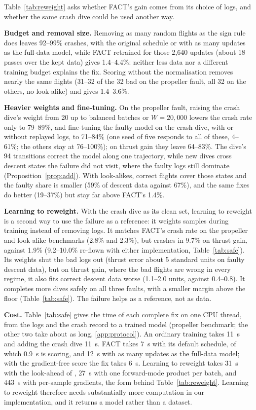 \documentclass[preprint,12pt]{elsarticle}
\newcommand{\method}{FACT}
\begin{document}
Table~\ref{tab:reweight} asks whether \method{}'s gain comes from its choice of logs, and whether the same crash dive could be used another way.

\textbf{Budget and removal size.} Removing as many random flights as the sign rule does leaves 92--99\% crashes, with the original schedule or with as many updates as the full-data model, while \method{} retrained for those 2,640 updates (about 18 passes over the kept data) gives 1.4--4.4\%: neither less data nor a different training budget explains the fix. Scoring without the normalisation removes nearly the same flights (31--32 of the 32 bad on the propeller fault, all 32 on the others, no look-alike) and gives 1.4--3.6\%.

\textbf{Heavier weights and fine-tuning.} On the propeller fault, raising the crash dive's weight from 20 up to balanced batches or $W=20{,}000$ lowers the crash rate only to 79--89\%, and fine-tuning the faulty model on the crash dive, with or without replayed logs, to 71--84\% (one seed of five responds to all of these, 4--61\%; the others stay at 76--100\%); on thrust gain they leave 64--83\%. The dive's 94 transitions correct the model along one trajectory, while new dives cross descent states the failure did not visit, where the faulty logs still dominate (Proposition~\ref{prop:add}). With look-alikes, correct flights cover those states and the faulty share is smaller (59\% of descent data against 67\%), and the same fixes do better (19--37\%) but stay far above \method{}'s 1.4\%.

\textbf{Learning to reweight.} With the crash dive as its clean set, learning to reweight is a second way to use the failure as a reference: it weights samples during training instead of removing logs. It matches \method{}'s crash rate on the propeller and look-alike benchmarks (2.8\% and 2.3\%), but crashes in 9.7\% on thrust gain, against 1.9\% (9.2--10.0\% re-flown with either implementation, Table~\ref{tab:safe}). Its weights shut the bad logs out (thrust error about 5 standard units on faulty descent data), but on thrust gain, where the bad flights are wrong in every regime, it also fits correct descent data worse (1.1--2.0 units, against 0.4--0.8). It completes more dives safely on all three faults, with a smaller margin above the floor (Table~\ref{tab:safe}). The failure helps as a reference, not as data.

\textbf{Cost.} Table~\ref{tab:safe} gives the time of each complete fix on one CPU thread, from the logs and the crash record to a trained model (propeller benchmark; the other two take about as long, \ref{app:protocol}). An ordinary training takes 11~s and adding the crash dive 11~s. \method{} takes 7~s with its default schedule, of which 0.9~s is scoring, and 12~s with as many updates as the full-data model; with the gradient-free score the fix takes 6~s. Learning to reweight takes 31~s with the look-ahead of \citet{ren2018l2rw}, 27~s with one forward-mode product per batch, and 443~s with per-sample gradients, the form behind Table~\ref{tab:reweight}. Learning to reweight therefore needs substantially more computation in our implementation, and it returns a model rather than a dataset.
\end{document}
